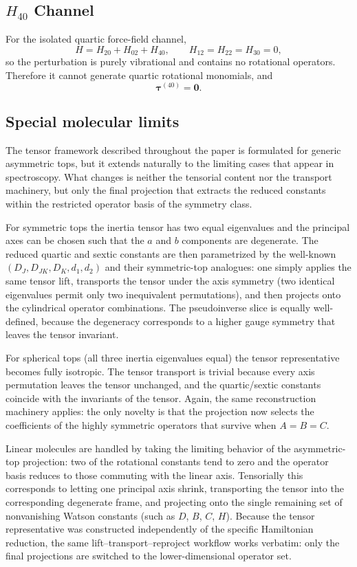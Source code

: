 \documentclass[aip,jcp,reprint]{revtex4-2}
\begin{document}
\begin{widetext}
\section{$H_{40}$ Channel}
For the isolated quartic force-field channel,
\begin{equation}
H = H_{20} + H_{02} + H_{40},
\qquad H_{12}=H_{22}=H_{30}=0,
\end{equation}
so the perturbation is purely vibrational and contains no rotational operators.
Therefore it cannot generate quartic rotational monomials, and
\begin{equation}
\bm{\tau}^{(40)} = \bm{0}.
\end{equation}

\subsection{Special molecular limits}

The tensor framework described throughout the paper is formulated for
generic asymmetric tops, but it extends naturally to the limiting cases
that appear in spectroscopy. What changes is neither the tensorial
content nor the transport machinery, but only the final projection that
extracts the reduced constants within the restricted operator basis of
the symmetry class.

For symmetric tops the inertia tensor has two equal eigenvalues and the
principal axes can be chosen such that the \(a\) and \(b\) components
are degenerate. The reduced quartic and sextic constants are then
parametrized by the well-known \((D_{J},D_{JK},D_K,d_1,d_2)\) and
their symmetric-top analogues: one simply applies the same tensor lift,
transports the tensor under the axis symmetry (two identical eigenvalues
permit only two inequivalent permutations), and then projects onto the
cylindrical operator combinations. The pseudoinverse slice is equally
well-defined, because the degeneracy corresponds to a higher gauge
symmetry that leaves the tensor invariant.

For spherical tops (all three inertia eigenvalues equal) the tensor
representative becomes fully isotropic. The tensor transport is trivial
because every axis permutation leaves the tensor unchanged, and the
quartic/sextic constants coincide with the invariants of the tensor.
Again, the same reconstruction machinery applies: the only novelty is
that the projection now selects the coefficients of the highly symmetric
operators that survive when \(A=B=C\).

Linear molecules are handled by taking the limiting behavior of the
asymmetric-top projection: two of the rotational constants tend to zero
and the operator basis reduces to those commuting with the linear axis.
Tensorially this corresponds to letting one principal axis shrink,
transporting the tensor into the corresponding degenerate frame, and
projecting onto the single remaining set of nonvanishing Watson constants
(such as \(D\), \(B\), \(C\), \(H\)). Because the tensor representative
was constructed independently of the specific Hamiltonian reduction, the
same lift–transport–reproject workflow works verbatim: only the final
projections are switched to the lower-dimensional operator set.


\end{widetext}
\end{document}
